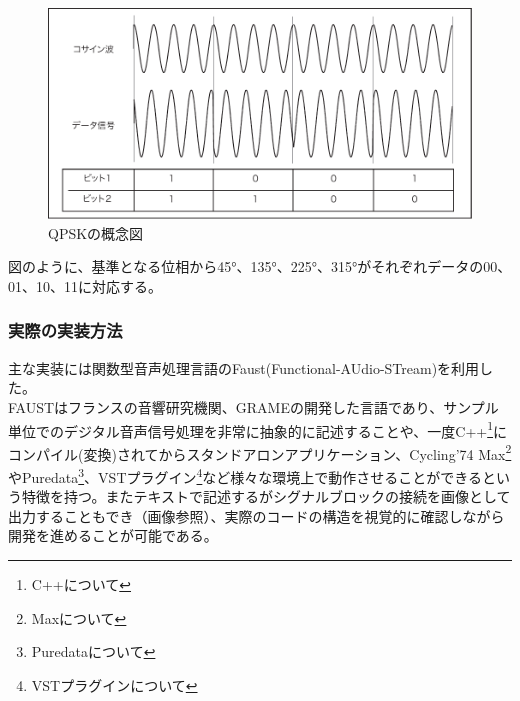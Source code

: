 \documentclass[a4paper,report]{jsbook}
\begin{document}
\begin{no-prefix-figure-caption}

\begin{figure}[htbp]
\centering
\includegraphics[width=1.00000\textwidth]{./img/qpsk_setsumei.pdf}
\caption{QPSKの概念図}
\end{figure}

\end{no-prefix-figure-caption}

図のように、基準となる位相から45°、135°、225°、315°がそれぞれデータの00、01、10、11に対応する。

\subsubsection{実際の実装方法}\label{ux5b9fux969bux306eux5b9fux88c5ux65b9ux6cd5}

主な実装には関数型音声処理言語のFaust(Functional-AUdio-STream)を利用した。\\
FAUSTはフランスの音響研究機関、GRAMEの開発した言語であり、サンプル単位でのデジタル音声信号処理を非常に抽象的に記述することや、一度C++\footnote{C++について}にコンパイル(変換)されてからスタンドアロンアプリケーション、Cycling'74
Max\footnote{Maxについて}やPuredata\footnote{Puredataについて}、VSTプラグイン\footnote{VSTプラグインについて}など様々な環境上で動作させることができるという特徴を持つ。またテキストで記述するがシグナルブロックの接続を画像として出力することもでき（画像参照）、実際のコードの構造を視覚的に確認しながら開発を進めることが可能である。
\end{document}
